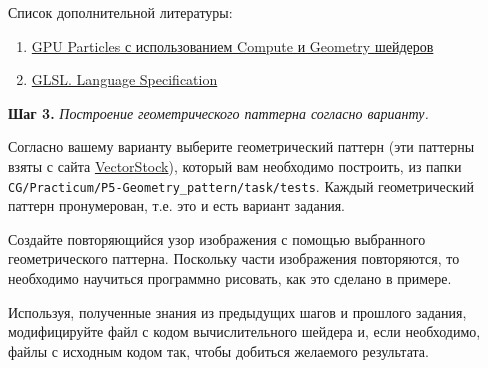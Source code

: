 \documentclass[a4paper,12pt]{article}
\begin{document}
    Список дополнительной литературы:
    \begin{enumerate}
        \item \href{https://habr.com/ru/articles/248755/}{GPU Particles с использованием Compute и Geometry шейдеров}
        \item \href{https://www.khronos.org/registry/OpenGL/specs/gl/}{GLSL. Language Specification}
    \end{enumerate}
    
    \textbf{Шаг 3.} \textit{Построение геометрического паттерна согласно варианту.}
    
    Согласно вашему варианту выберите геометрический паттерн (эти паттерны взяты с сайта \href{https://www.vectorstock.com}{VectorStock}), который вам необходимо построить, из папки 
     \texttt{CG/Practicum/P5-Geometry\_pattern/task/tests}. 
    Каждый геометрический паттерн пронумерован, т.е. это и есть вариант задания.
    
    Создайте повторяющийся узор изображения с помощью выбранного геометрического паттерна. Поскольку части изображения повторяются, то необходимо научиться программно рисовать, как это сделано в примере.
    
    Используя, полученные знания из предыдущих шагов и прошлого задания, модифицируйте файл с кодом вычислительного шейдера и, если необходимо, файлы с исходным кодом так, чтобы добиться желаемого результата.
    
\end{document}
